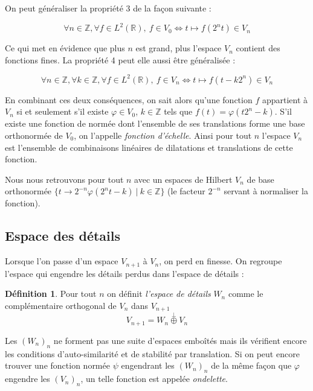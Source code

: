 \documentclass[]{article}
\theoremstyle{remark}
\theoremstyle{definition}
\newtheorem{mydef}{Définition}
\begin{document}
	On peut généraliser la propriété 3 de la façon suivante :
		
	$$\forall n \in \mathbb{Z}, \forall f \in L^2(\mathbb{R}), ~ f \in V_0 \Longleftrightarrow t \mapsto f \left(2^n t\right) \in V_{n}$$

	Ce qui met en évidence que plus $n$ est grand, plus l'espace $V_n$ contient des fonctions fines. La propriété 4 peut elle aussi être généralisée :
		
	$$\forall n \in \mathbb{Z}, \forall k \in \mathbb{Z}, \forall f \in L^2(\mathbb{R}), ~ f \in V_n \Longleftrightarrow t \mapsto f \left(t -k 2^n\right) \in V_{n}$$
	
	En combinant ces deux conséquences, on sait alors qu'une fonction $f$ appartient à $V_n$ si et seulement s'il existe $\varphi \in V_0$, $k \in \mathbb{Z}$ tels que $f(t) = \varphi (t 2^n - k)$. S'il existe une fonction de normée dont l'ensemble de ses translations forme une base orthonormée de $V_0$, on l'appelle \textit{fonction d'échelle}. Ainsi pour tout $n$ l'espace $V_n$ est l'ensemble de combinaisons linéaires de dilatations et translations de cette fonction.
	
	Nous nous retrouvons pour tout $n$ avec un espaces de Hilbert $V_n$ de base orthonormée $\{t \to 2^{-n} \varphi(2^n t - k) ~ | ~ k \in \mathbb{Z}\}$ (le facteur $2^{-n}$ servant à normaliser la fonction).
	
	\subsection{Espace des détails}
	
	Lorsque l'on passe d'un espace $V_{n+1}$ à $V_{n}$, on perd en finesse. On regroupe l'espace qui engendre les détails perdus dans l'espace de détails :
	
	\begin{mydef}
		Pour tout $n$ on définit \textit{l'espace de détails} $W_{n}$ comme le complémentaire orthogonal de $V_{n}$ dans $V_{n+1}$ $$V_{n+1} = W_n \stackrel{\perp}{\oplus} V_n$$
	\end{mydef}
	
	Les $(W_n)_n$ ne forment pas une suite d'espaces emboîtés mais ils vérifient encore les conditions d'auto-similarité et de stabilité par translation. Si on peut encore trouver une fonction normée $\psi$ engendrant les $(W_n)_n$ de la même façon que $\varphi$ engendre les $(V_n)_n$, un telle fonction est appelée \textit{ondelette}.
\end{document}
